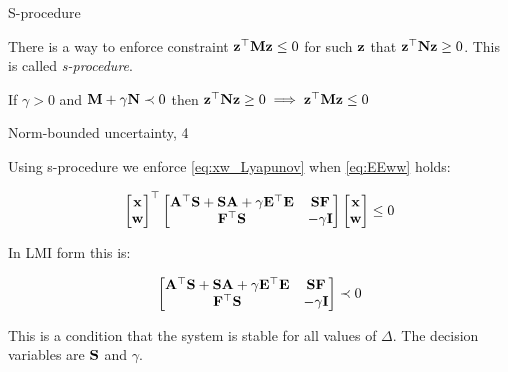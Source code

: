 \documentclass{beamer}
\begin{document}
	\begin{frame}{S-procedure}
		\begin{flushleft}
			
			There is a way to enforce constraint $\mathbf{z}^\top \mathbf{M}\mathbf{z} \leq 0$ for such $\mathbf{z}$ that $\mathbf{z}^\top \mathbf{N}\mathbf{z} \geq 0$. This is called \emph{s-procedure}.
			
			\begin{theorem}
				If $\gamma > 0$ and $\mathbf{M} + \gamma \mathbf{N} \prec 0$ then $\mathbf{z}^\top \mathbf{N}\mathbf{z} \geq 0 \implies \mathbf{z}^\top \mathbf{M}\mathbf{z} \leq 0$ 
			\end{theorem}
			
		\end{flushleft}
	\end{frame}
	
	
	
	\begin{frame}{Norm-bounded uncertainty, 4}
		\begin{flushleft}
			
			
			Using s-procedure we enforce \eqref{eq:xw_Lyapunov} when \eqref{eq:EEww} holds:
			
			\begin{equation}
				\begin{bmatrix}
					\mathbf{x} \\ \mathbf{w}
				\end{bmatrix}^\top
				\begin{bmatrix}
					\mathbf{A}^\top \mathbf{S} + \mathbf{S}\mathbf{A} + \gamma \mathbf{E}^\top \mathbf{E} & \mathbf{S}\mathbf{F} \\
					\mathbf{F}^\top\mathbf{S} & -\gamma\mathbf{I}
				\end{bmatrix}		
				\begin{bmatrix}
					\mathbf{x} \\ \mathbf{w}
				\end{bmatrix}
				\leq 0
			\end{equation}
			
			In LMI form this is:
			
			\begin{equation}
				\begin{bmatrix}
					\mathbf{A}^\top \mathbf{S} + \mathbf{S}\mathbf{A} + \gamma \mathbf{E}^\top \mathbf{E} & \mathbf{S}\mathbf{F} \\
					\mathbf{F}^\top\mathbf{S} & -\gamma\mathbf{I}
				\end{bmatrix}		
				\prec 0
			\end{equation}	
			
			
			This is a condition that the system is stable for all values of $\Delta$. The decision variables are $\mathbf{S}$ and $\gamma$.		
			
		\end{flushleft}
	\end{frame}
	
\end{document}

